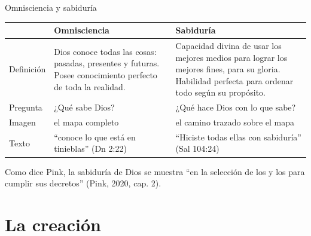 \begin{frame}{Omnisciencia y sabiduría}
\scriptsize\renewcommand{\arraystretch}{1.25}
\begin{tabular}{@{}>{\RaggedRight\arraybackslash}p{2.0cm}>{\RaggedRight\arraybackslash}p{4.9cm}>{\RaggedRight\arraybackslash}p{4.9cm}@{}}
\toprule
 & \textbf{Omnisciencia} & \textbf{Sabiduría} \\ \midrule
Definición & Dios conoce todas las cosas: pasadas, presentes y futuras. Posee conocimiento perfecto de toda la realidad. & Capacidad divina de usar los mejores medios para lograr los mejores fines, para su gloria. Habilidad perfecta para ordenar todo según su propósito. \\
Pregunta & ¿Qué sabe Dios? & ¿Qué hace Dios con lo que sabe? \\
Imagen & el mapa completo & el camino trazado sobre el mapa \\
Texto & ``conoce lo que está en tinieblas'' (Dn 2:22) & ``Hiciste todas ellas con sabiduría'' (Sal 104:24) \\
\bottomrule
\end{tabular}\par\medskip
\begin{tcolorbox}[colback=papiro,colframe=dorado,boxrule=1.2pt,arc=3pt]
\centering\small Como dice Pink, la sabiduría de Dios se muestra ``en la selección de los  y los  para cumplir sus decretos'' (Pink, 2020, cap. 2).
\end{tcolorbox}
\end{frame}

\section{La creación}

